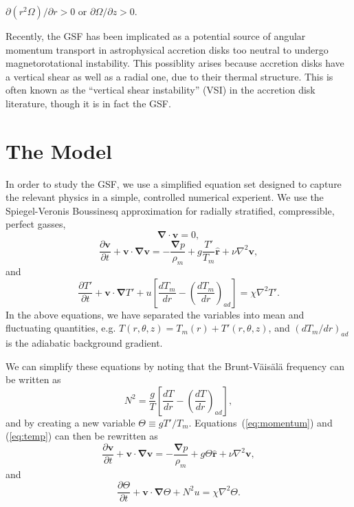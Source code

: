 \documentclass{jfm}
\begin{document}
$\partial (r^2 \Omega)/\partial r > 0$ or
$\partial \Omega / \partial z > 0$. 

Recently, the GSF has been implicated as a potential source of angular
momentum transport in astrophysical accretion disks too neutral to
undergo magnetorotational instability. This possiblity arises because
accretion disks have a vertical shear as well as a radial one, due to
their thermal structure. This is often known as the ``vertical shear
instability'' (VSI) in the accretion disk literature, though it is in
fact the GSF.

\section{The Model}
\label{sec:model}

In order to study the GSF, we use a simplified equation set designed
to capture the relevant physics in a simple, controlled numerical
experient. We use the Spiegel-Veronis Boussinesq approximation for
radially stratified, compressible, perfect gasses,
\begin{equation}
  \label{eq:continuity}
  \mathbf{\nabla \cdot v} = 0,
\end{equation}
\begin{equation}
  \label{eq:momentum}
  \frac{\partial \mathbf{v}}{\partial t} + \mathbf{v \cdot \nabla v} = -\frac{\mathbf{\nabla} p}{\rho_m} + g \frac{T'}{T_m}\mathbf{\hat{r}} + \nu \nabla^2 \mathbf{v},
\end{equation}
and
\begin{equation}
  \label{eq:temp}
  \frac{\partial T'}{\partial t} + \mathbf{v \cdot \nabla} T' + u \left[\frac{d T_m}{dr} - \left(\frac{d T_m}{dr}\right)_{ad}\right] = \chi \nabla^2 T'.
\end{equation}
In the above equations, we have separated the variables into mean and
fluctuating quantities, e.g. $T(r, \theta, z) = T_m(r) + T'(r, \theta, z)$, and $(d T_m/dr)_{ad}$ is the
adiabatic background gradient.

We can simplify these equations by noting that the Brunt-V\"ais\"al\"a frequency can be written as
\begin{equation}
  \label{eq:brunt}
  N^2 = \frac{g}{T}\left[\frac{d T}{dr} - \left(\frac{d T}{dr}\right)_{ad}\right],
\end{equation}
and by creating a new variable $\Theta \equiv g T'/T_m$. Equations~(\ref{eq:momentum}) and (\ref{eq:temp}) can then be rewritten as 
\begin{equation}
  \label{eq:final_momentum}
  \frac{\partial \mathbf{v}}{\partial t} + \mathbf{v \cdot \nabla v} = -\frac{\mathbf{\nabla} p}{\rho_m} + g \Theta \mathbf{\hat{r}} + \nu \nabla^2 \mathbf{v},
\end{equation}
and
\begin{equation}
  \label{eq:final_temp}
  \frac{\partial \Theta}{\partial t} + \mathbf{v \cdot \nabla} \Theta + N^2 u = \chi \nabla^2 \Theta.
\end{equation}
\end{document}
